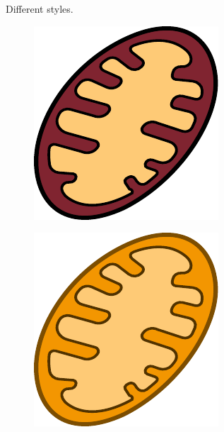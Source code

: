 \begin{figure}[H]
\begin{subfigure}[t]{0.3\linewidth}
    \end{subfigure}
    \caption{Different styles.}
    \label{fig:diff-styles}
\end{figure}
\begin{figure}[H]
    \centering
    \begin{subfigure}[t]{0.2\linewidth}
        \includegraphics[width=\textwidth]{chapters/images/mitochondria-black-lines}
    \end{subfigure}
    \begin{subfigure}[t]{0.2\linewidth}
        \includegraphics[width=\textwidth]{chapters/images/mitochondria-yellow}

\end{subfigure}
\end{figure}

